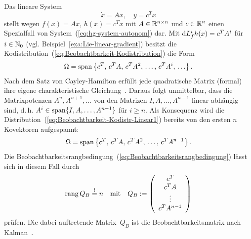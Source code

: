 \begin{example}
\label{exa:Beobachtbarkeit-linear-autonom}Das lineare System
\[
\dot{x}=Ax,\quad y=c^{T}x
\]
stellt wegen $f(x)=Ax$, $h(x)=c^{T}x$ mit $A\in{\mathbb{R}}^{n\times n}$
und $c\in{\mathbb{R}}^{n}$ einen Spezialfall von System~(\ref{eq:hg-system-autonom})
dar. Mit ${\mathrm{d}} L_{f}^{i}h(x)=c^{T}A^{i}$ für $i\in{\mathbb{N}_0}$ (vgl. Beispiel~\ref{exa:Lie-linear-gradient})
besitzt die Kodistribution~(\ref{eq:Beobachtbarkeit-Kodistribution})
die Form 
\begin{equation}
\Omega={\operatorname{span}}\left\{ c^{T},\,c^{T}A,\,c^{T}A^{2},\,\ldots,\,c^{T}A^{i},\,\ldots\right\} .\label{eq:Beobachtbarkeit-Kodistr-Linear1}
\end{equation}
Nach dem Satz von Cayley-Hamilton
erfüllt jede quadratische Matrix (formal) ihre eigene charakteristische
Gleichung~\cite{gantmacher86,beutelspacher2001}. Daraus folgt unmittelbar,
dass die Matrixpotenzen $A^{n},A^{n+1},\ldots$ von den Matrizen $I,A,\ldots,A^{n-1}$
linear abhängig sind, d.\,h. $A^{i}\in{\operatorname{span}}\{I,A,\ldots,A^{n-1}\}$
für $i\geq n$. Als Konsequenz wird die Distribution~(\ref{eq:Beobachtbarkeit-Kodistr-Linear1})
bereits von den ersten $n$ Kovektoren aufgespannt:
\begin{equation}
\Omega={\operatorname{span}}\left\{ c^{T},\,c^{T}A,\,c^{T}A^{2},\,\ldots,\,c^{T}A^{n-1}\right\} .\label{eq:Beobachtbarkeit-Kodistr-Linear2}
\end{equation}
Die Beobachtbarkeitsrangbedingung~(\ref{eq:Beobachtbarkeitsrangbedingung})
lässt sich in diesem Fall durch 
\[
{\operatorname{rang}}\,Q_{B}\stackrel{!}{=}n\quad\text{mit}\quad Q_{B}:=\left(\begin{array}{c}
c^{T}\\
c^{T}A\\
\vdots\\
c^{T}A^{n-1}
\end{array}\right)
\]
prüfen. Die dabei auftretende Matrix~$Q_{B}$ ist die Beobachtbarkeitsmatrix
nach Kalman~\cite{lunze-rt2}.
\end{example}

